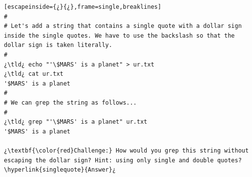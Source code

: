 \begin{lstlisting}[escapeinside={¿}{¿},frame=single,breaklines]
#
# Let's add a string that contains a single quote with a dollar sign inside the single quotes. We have to use the backslash so that the dollar sign is taken literally.
#
¿\tld¿ echo "'\$MARS' is a planet" > ur.txt
¿\tld¿ cat ur.txt
'$MARS' is a planet
#
# We can grep the string as follows...
#
¿\tld¿ grep "'\$MARS' is a planet" ur.txt
'$MARS' is a planet

¿\textbf{\color{red}Challenge:} How would you grep this string without escaping the dollar sign? Hint: using only single and double quotes? \hyperlink{singlequote}{Answer}¿ 
\end{lstlisting}
 
